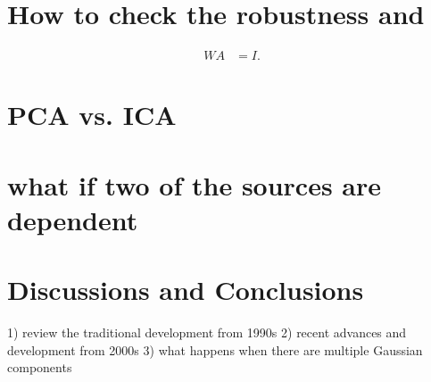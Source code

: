 \documentclass[aps,prl,preprint,superscriptaddress]{revtex4-2}
\begin{document}
\section{How to check the robustness and }

\begin{align}
W A &= I.
\end{align}



\section{PCA vs. ICA}

\section{what if two of the sources are dependent}

\section{Discussions and Conclusions}
1) review the traditional development from 1990s
2) recent advances and development from 2000s  
3) what happens when there are multiple Gaussian components

\begin{acknowledgments}

\end{acknowledgments}



%
\end{document}
